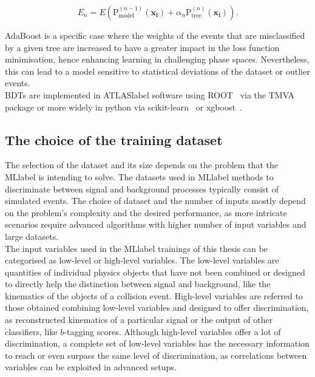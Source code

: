 \begin{equation}
    E_n = E\left(\text{P}_{\text{model}}^{(n-1)}(\mathbf{x_i})+\alpha_n \text{P}_{\text{tree}}^{(n)}(\mathbf{x_i})\right).
\end{equation}

AdaBoost is a specific case where the weights of the events that are misclassified by a given tree are increased to have a greater impact in the loss function minimisation, hence enhancing learning in challenging phase spaces. Nevertheless, this can lead to a model sensitive to statistical deviations of the dataset or outlier events.\\

BDTs are implemented in \acrshort{ATLASlabel} software using ROOT~\cite{BRUN199781} via the TMVA~\cite{TMVA} package or more widely in python via scikit-learn~\cite{scikit-learn} or xgboost~\cite{Chen_2016}.

\subsection{The choice of the training dataset}

The selection of the dataset and its size depends on the problem that the \acrshort{MLlabel} is intending to solve. The datasets used in \acrshort{MLlabel} methods to discriminate between signal and background processes typically consist of simulated events. The choice of dataset and the number of inputs mostly depend on the problem's complexity and the desired performance, as more intricate scenarios require advanced algorithms with higher number of input variables and large datasets.\\

The input variables used in the \acrshort{MLlabel} trainings of this thesis can be categorised as low-level or high-level variables. The low-level variables are quantities of individual physics objects that have not been combined or designed to directly help the distinction between signal and background, like the kinematics of the objects of a collision event. High-level variables are referred to those obtained combining low-level variables and designed to offer discrimination, as reconstructed kinematics of a particular signal or the output of other classifiers, like $b$-tagging scores. Although high-level variables offer a lot of discrimination, a complete set of low-level variables has the necessary information to reach or even surpass the same level of discrimination, as correlations between variables can be exploited in advanced setups.\\


